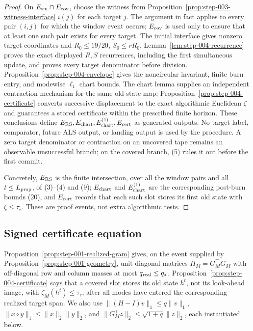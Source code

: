 \begin{proof}
On \(E_{\rm sm}\cap E_{\rm cov}\), choose the witness from Proposition~\ref{prop:step-003-witness-interface} \(i(j)\) for
each target \(j\). The argument in fact applies to every pair \((i,j)\) for
which the window event occurs; \(E_{\rm cov}\) is used only to
ensure that at least one such pair exists for every target. The initial interface gives nonzero target
coordinates and \(R_0\le19/20\), \(S_0\le rR_0\). Lemma~\ref{lem:step-004-recurrence}
proves the exact displayed \(R,S\) recurrences, including the first
simultaneous update, and proves every target denominator before division.
Proposition~\ref{prop:step-004-envelope} gives the noncircular invariant,
finite burn entry, and modewise \(\ell_1\) chart bounds. The chart lemma
supplies an independent contraction mechanism for the same old-state map;
Proposition~\ref{prop:step-004-certificate} converts successive displacement
to the exact algorithmic Euclidean \(\zeta\) and guarantees a stored
certificate within the prescribed finite horizon. These conclusions define
\(E_{\rm RS},E_{\rm chart},E_{\rm chart}^{(1)},E_{\rm cert}\) as generated
outputs. No target label, comparator, future ALS output, or landing output is
used by the procedure. A zero target denominator or contraction on an
uncovered tape remains an observable unsuccessful branch; on the covered
branch, (5) rules it out before the first commit.

Concretely, \(E_{\rm RS}\) is the finite intersection, over all the window pairs and all \(t\le L_{\rm prop}\), of (3)--(4) and (9);
\(E_{\rm chart}\) and \(E_{\rm chart}^{(1)}\) are the corresponding post-burn
bounds (20), and \(E_{\rm cert}\) records that each such slot stores its
first old state with \(\zeta\le\tau_r\). These are proof events, not extra
algorithmic tests.
\end{proof}

\subsection{Signed certificate equation}\label{app:step-005}

Proposition~\ref{prop:step-001-realized-gram} gives, on the event supplied by
Proposition~\ref{prop:step-001-geometry}, unit diagonal matrices
$H_M=G_M^\top G_M$ with off-diagonal row and column masses at most
$q_{\rm real}\le q_*$. Proposition~\ref{prop:step-004-certificate} says that
a covered slot stores its old state $h^t$, not its look-ahead image, with
$\zeta_M(h^t)\le\tau_r$, after all modes have entered the corresponding
realized target span. We also use
$\|(H-I)v\|_1\le q\|v\|_1$,
$\|x\circ y\|_1\le\|x\|_2\|y\|_2$, and
$\|G_M^\top z\|_2\le\sqrt{1+q}\|z\|_2$, each instantiated below.

